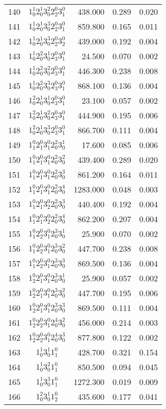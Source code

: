 \documentclass{revtex4}
\begin{document}
\begin{table}
\begin{tabular}{rcrrr}
140&$1_0^1 2_0^1 3_0^2 2_2^0 3_1^0$& 438.000& 0.289& 0.020\\
141&$1_0^1 2_0^1 3_0^3 2_2^0 3_1^0$& 859.800& 0.165& 0.011\\
142&$1_0^1 2_0^1 3_0^3 2_2^0 3_2^0$& 439.000& 0.192& 0.004\\
143&$1_0^1 2_0^2 3_0^1 2_3^0 3_1^0$& 24.500& 0.070& 0.002\\
144&$1_0^1 2_0^2 3_0^2 2_3^0 3_1^0$& 446.300& 0.238& 0.008\\
145&$1_0^1 2_0^2 3_0^3 2_3^0 3_1^0$& 868.100& 0.136& 0.004\\
146&$1_0^2 2_0^1 3_0^1 2_3^0 3_1^0$& 23.100& 0.057& 0.002\\
147&$1_0^2 2_0^1 3_0^2 2_3^0 3_1^0$& 444.900& 0.195& 0.006\\
148&$1_0^2 2_0^1 3_0^3 2_3^0 3_1^0$& 866.700& 0.111& 0.004\\
149&$1_1^0 2_1^0 3_1^0 2_0^2 3_0^1$& 17.600& 0.085& 0.006\\
150&$1_1^0 2_1^0 3_1^0 2_0^2 3_0^2$& 439.400& 0.289& 0.020\\
151&$1_1^0 2_1^0 3_1^0 2_0^2 3_0^3$& 861.200& 0.164& 0.011\\
152&$1_1^0 2_1^0 3_1^0 2_0^2 3_0^4$& 1283.000& 0.048& 0.003\\
153&$1_1^0 2_1^0 3_2^0 2_0^2 3_0^3$& 440.400& 0.192& 0.004\\
154&$1_1^0 2_1^0 3_2^0 2_0^2 3_0^4$& 862.200& 0.207& 0.004\\
155&$1_1^0 2_2^0 3_1^0 2_0^3 3_0^1$& 25.900& 0.070& 0.002\\
156&$1_1^0 2_2^0 3_1^0 2_0^3 3_0^2$& 447.700& 0.238& 0.008\\
157&$1_1^0 2_2^0 3_1^0 2_0^3 3_0^3$& 869.500& 0.136& 0.004\\
158&$1_2^0 2_1^0 3_1^0 2_0^3 3_0^1$& 25.900& 0.057& 0.002\\
159&$1_2^0 2_1^0 3_1^0 2_0^3 3_0^2$& 447.700& 0.195& 0.006\\
160&$1_2^0 2_1^0 3_1^0 2_0^3 3_0^3$& 869.500& 0.111& 0.004\\
161&$1_2^0 2_2^0 3_1^0 2_0^4 3_0^2$& 456.000& 0.214& 0.003\\
162&$1_2^0 2_2^0 3_1^0 2_0^4 3_0^3$& 877.800& 0.122& 0.002\\
163&$1_0^1 3_0^1 1_1^0$& 428.700& 0.321& 0.154\\
164&$1_0^1 3_0^2 1_1^0$& 850.500& 0.094& 0.045\\
165&$1_0^1 3_0^3 1_1^0$& 1272.300& 0.019& 0.009\\
166&$1_0^2 3_0^1 1_2^0$& 435.600& 0.177& 0.041\\

\end{tabular}
\end{table}
\end{document}
